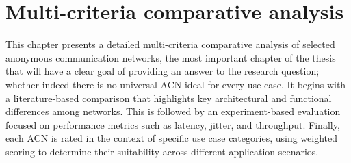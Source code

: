 \chapter{Multi-criteria comparative analysis}
\label{chap:Analysis}

This chapter presents a detailed multi-criteria comparative analysis of selected anonymous communication networks, the most important chapter of the thesis that will have a clear goal of providing an answer to the research question; whether indeed there is no universal ACN ideal for every use case. It begins with a literature-based comparison that highlights key architectural and functional differences among networks. This is followed by an experiment-based evaluation focused on performance metrics such as latency, jitter, and throughput. Finally, each ACN is rated in the context of specific use case categories, using weighted scoring to determine their suitability across different application scenarios.

